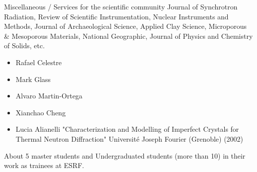 \begin{rubric}{Miscellaneous / Services for the scientific community}
\entry*[] Journal of Synchrotron Radiation, Review of Scientific Instrumentation, Nuclear Instruments and Methods,  Journal of Archaeological Science, Applied Clay Science, Microporous \& Mesoporous Materials, National Geographic, Journal of Physics and Chemistry of Solids, etc.

\entry*[Ph.D.] 
\begin{itemize}

\item Rafael Celestre
\item Mark Glass
\item Alvaro Martin-Ortega
\item Xianchao Cheng
\item Lucia Alianelli "Characterization and Modelling of
Imperfect Crystals for Thermal Neutron Diffraction" Université Joseph Fourier (Grenoble) (2002)
\end{itemize}

\entry*[Others] About 5 master students and Undergraduated students (more than 10) in their work as trainees at ESRF. 




\end{rubric}
